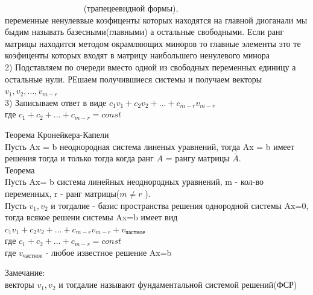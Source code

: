\documentclass[a4paper, 12pt]{article}
\begin{document}
$ \quad \quad \quad \quad \quad \quad \quad \quad \quad  $ (трапецеевидной формы),\\
 переменные ненулеввые коэфиценты которых находятся на главной диоганали мы быдим называть базесными(главными) а остальные свободными. Если ранг матрицы находится методом окрамляющих миноров то главные элементы это те коэфиценты которых входят в матрицу наибольшего ненулевого минора\\
2) Подставляем по очереди вместо одной из свободных переменных единицу а остальные нули. РЕшаем получившиеся системы и получаем векторы $ v_1,v_2,\dots,v_{m-r} $\\
3) Записываем ответ в виде $ c_1v_1 + c_2v_2 + \ldots + c_{m-r}v_{m-r} $\\
где $ c_1 + c_2 + \ldots + c_{m-r} = const$\\

\begin{mdframed}[backgroundcolor=blue!20] 
         Теорема Кронейкера-Капели\\
         Пусть Ax = b неоднородная система линеных уравнений, тогда Ax = b имеет решения тогда и только тогда когда ранг $ A $  = рангу матрицы $ \overline{A} $. \\

         Теорема\\
         Пусть Ax= b система линейных неоднородных уравнений, m - кол-во переменных, r - ранг матрицы($ m \neq r $ ).\\
         Пусть $ v_1,v_2  $ и тогдалие - базис пространства решения однородной системы Ax=0, тогда всякое решени системы Ax=b имеет вид $ c_1v_1 + c_2v_2 + \ldots + c_{m-r}v_{m-r}  + v_{\text{частное}}$ \\
         где $ c_1 + c_2 + \ldots + c_{m-r} = const$\\
         где $ v_{\text{частное}} $ - любое известное решение Ax=b 
      \end{mdframed}
        
\newpage
Замечание:\\
векторы $ v_1,v_2  $ и тогдалие называют фундаментальной системой решений(ФСР)\\
















\newpage
\end{document}
